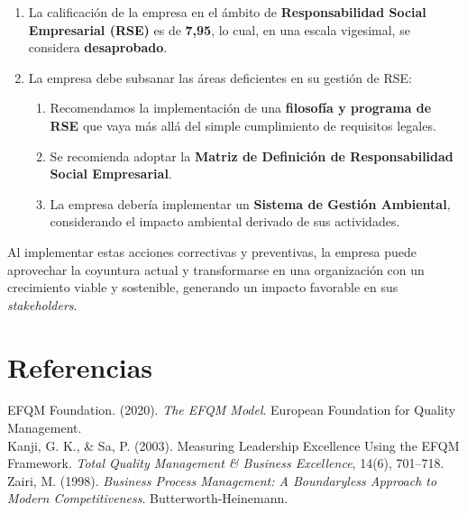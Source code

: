 \documentclass[a4paber,12pt]{article}
\begin{document}
\begin{enumerate}
		\item La calificación de la empresa en el ámbito de \textbf{Responsabilidad Social Empresarial (RSE)} es de \textbf{7,95}, lo cual, en una escala vigesimal, se considera \textbf{desaprobado}.
		
		\item La empresa debe subsanar las áreas deficientes en su gestión de RSE:
		\begin{enumerate}
			\item Recomendamos la implementación de una \textbf{filosofía y programa de RSE} que vaya más allá del simple cumplimiento de requisitos legales.
			
			\item Se recomienda adoptar la \textbf{Matriz de Definición de Responsabilidad Social Empresarial}.
			
			\item La empresa debería implementar un \textbf{Sistema de Gestión Ambiental}, considerando el impacto ambiental derivado de sus actividades.
		\end{enumerate}
	\end{enumerate}
	
	Al implementar estas acciones correctivas y preventivas, la empresa puede aprovechar la coyuntura actual y transformarse en una organización con un crecimiento viable y sostenible, generando un impacto favorable en sus \emph{stakeholders}.
	
	\section*{Referencias}
	EFQM Foundation. (2020). \textit{The EFQM Model}. European Foundation for Quality Management.\\
	Kanji, G. K., \& Sa, P. (2003). Measuring Leadership Excellence Using the EFQM Framework. \emph{Total Quality Management \& Business Excellence}, 14(6), 701–718.\\
	Zairi, M. (1998). \textit{Business Process Management: A Boundaryless Approach to Modern Competitiveness}. Butterworth-Heinemann.
	
	
\end{document}
